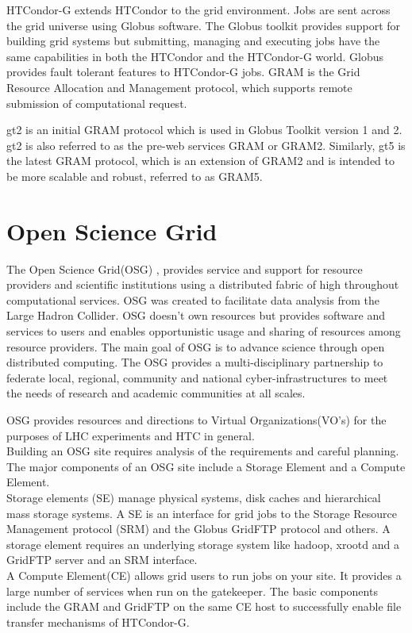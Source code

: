 \documentclass[ms,electronic,double]{nuthesis}
\begin{document}
HTCondor-G extends HTCondor to the grid environment. Jobs are sent across the grid universe using 
Globus software. The Globus toolkit provides support for building grid systems but 
submitting, managing and executing jobs have the same capabilities in both the HTCondor 
and the HTCondor-G world. Globus provides fault tolerant features to HTCondor-G 
jobs. GRAM is the Grid Resource Allocation and Management protocol, which supports remote 
submission of computational request.

gt2 is an initial GRAM protocol which is used in Globus Toolkit version 1 and 
2. gt2 is also referred to as the pre-web services GRAM or GRAM2. Similarly, gt5 is the latest GRAM protocol, which is an extension of GRAM2 and is intended 
to be more scalable and robust, referred to as GRAM5.

\section{Open Science Grid} The Open Science Grid(OSG) \cite{osg}, provides service and support 
for resource providers and scientific institutions using a distributed fabric of 
high throughout computational services. OSG was created to facilitate data analysis from the 
Large Hadron Collider\cite{osg}. OSG doesn't own resources but provides software and services to 
users and enables opportunistic usage and sharing of resources among resource providers.
The main goal of OSG is to advance science through open distributed computing. 
The OSG provides a multi-disciplinary partnership to federate local, regional, community and 
national cyber-infrastructures to meet the needs of research and academic communities at all scales.

OSG provides resources and directions to Virtual Organizations(VO's) for the purposes of LHC experiments
and HTC in general. \\

Building an OSG site requires analysis of the requirements and careful planning. The major 
components of an OSG site include a Storage Element and a Compute Element. \\
Storage elements (SE) manage physical systems, disk caches and hierarchical mass storage 
systems. A SE is an interface for grid jobs to the Storage Resource Management protocol (SRM) and the Globus 
GridFTP protocol and others. A storage element requires an underlying storage system like hadoop, xrootd
and a GridFTP server and an SRM interface.\\
A Compute Element(CE) allows grid users to run jobs on your site. It provides a 
large number of services when run on the gatekeeper. The basic components include 
the GRAM and GridFTP on the same CE host to successfully enable file transfer 
mechanisms of HTCondor-G.\\
\end{document}
